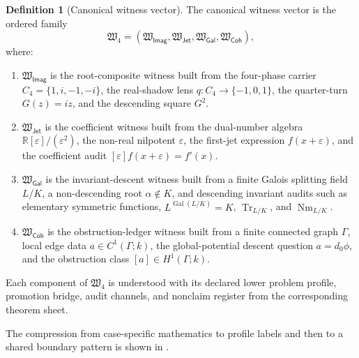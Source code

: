 \documentclass[11pt]{article}
\newcommand{\Imag}{\mathsf{Imag}}
\newcommand{\Jet}{\mathsf{Jet}}
\newcommand{\Galois}{\mathsf{Gal}}
\newcommand{\Coh}{\mathsf{Coh}}
\newcommand{\Gal}{\operatorname{Gal}}
\newcommand{\Tr}{\operatorname{Tr}}
\newcommand{\Nm}{\operatorname{Nm}}
\theoremstyle{definition}
\newtheorem{definition}[theorem]{Definition}
\begin{document}
\begin{definition}[Canonical witness vector]
\label{def:sau-canonical-witness-vector}
The canonical witness vector is the ordered family
\[
\mathfrak W_{4}
=
(\mathfrak W_{\Imag},\mathfrak W_{\Jet},\mathfrak W_{\Galois},\mathfrak W_{\Coh}),
\]
where:
\begin{enumerate}
\item \(\mathfrak W_{\Imag}\) is the root-composite witness built from the four-phase carrier \(C_4=\{1,i,-1,-i\}\), the real-shadow lens \(q:C_4\to\{-1,0,1\}\), the quarter-turn \(G(z)=iz\), and the descending square \(G^2\).
\item \(\mathfrak W_{\Jet}\) is the coefficient witness built from the dual-number algebra \(\mathbb R[\varepsilon]/(\varepsilon^2)\), the non-real nilpotent \(\varepsilon\), the first-jet expression \(f(x+\varepsilon)\), and the coefficient audit \([\varepsilon]f(x+\varepsilon)=f'(x)\).
\item \(\mathfrak W_{\Galois}\) is the invariant-descent witness built from a finite Galois splitting field \(L/K\), a non-descending root \(\alpha\notin K\), and descending invariant audits such as elementary symmetric functions, \(L^{\Gal(L/K)}=K\), \(\Tr_{L/K}\), and \(\Nm_{L/K}\).
\item \(\mathfrak W_{\Coh}\) is the obstruction-ledger witness built from a finite connected graph \(\Gamma\), local edge data \(a\in C^1(\Gamma;k)\), the global-potential descent question \(a=d_0\phi\), and the obstruction class \([a]\in H^1(\Gamma;k)\).
\end{enumerate}
Each component of \(\mathfrak W_4\) is understood with its declared lower problem profile, promotion bridge, audit channels, and nonclaim register from the corresponding theorem sheet.
\end{definition}

The compression from case-specific mathematics to profile labels and then to a
shared boundary pattern is shown in .
\end{document}
